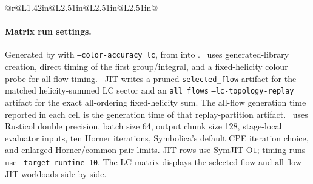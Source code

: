 \begin{landscape}
\begin{longtable}{@{}r@{\hspace{0.055in}}L{1.42in}@{\hspace{0.075in}}L{2.51in}@{\hspace{0.055in}}L{2.51in}@{\hspace{0.055in}}L{2.51in}@{}}
\addlinespace[0.12em]
\bottomrule
\end{longtable}
\endgroup
\end{landscape}

\paragraph{Matrix run settings.}
\noindent\footnotesize Generated by  with \texttt{--color-accuracy lc}, from  into . \AC\ uses generated-library creation, direct timing of the first group/integral, and a fixed-helicity colour probe for all-flow timing. \PAC\ JIT writes a pruned \texttt{selected\_flow} artifact for the matched helicity-summed LC sector and an \texttt{all\_flows} \texttt{--lc-topology-replay} artifact for the exact all-ordering fixed-helicity sum.  The all-flow generation time reported in each cell is the generation time of that replay-partition artifact. \PAC\ uses Rusticol double precision, batch size 64, output chunk size 128, stage-local evaluator inputs, ten Horner iterations, Symbolica's default CPE iteration choice, and enlarged Horner/common-pair limits.  JIT rows use SymJIT \(\mathrm{O}1\); timing runs use \texttt{--target-runtime 10}.  The LC matrix displays the selected-flow and all-flow JIT workloads side by side.
\par\smallskip